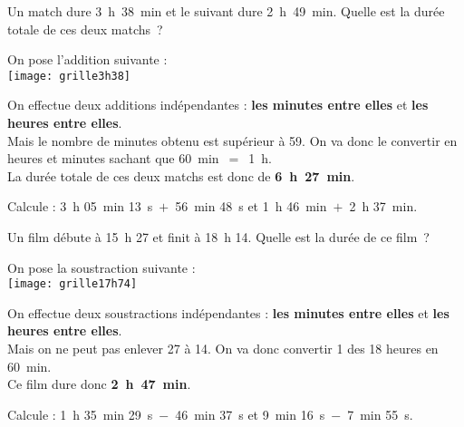 \begin{methode*1}

\begin{exemple*1}
Un match dure 3 h 38 min et le suivant dure 2 h 49 min. Quelle est la durée totale de ces deux matchs ? \\[1em]
\begin{minipage}[t]{.4\textwidth}
On pose l'addition suivante :\\[0.2em]

\texttt{[image: grille3h38]}
\end{minipage}\hfill%
\begin{minipage}[t]{.58\textwidth}
On effectue deux additions indépendantes : 
\textcolor{vert}{\textbf{les minutes entre elles}} et \textcolor{bleu}{\textbf{les heures entre elles}}.\\[0.75em]
Mais le nombre de minutes obtenu est supérieur à 59. 
On va donc le convertir en heures et minutes sachant que 60 min $=$ 1 h. \\[0.75em]
La durée totale de ces deux matchs est donc de \textcolor{rose}{\textbf{6 h 27 min}}.
\end{minipage}

\end{exemple*1}

\exercice

Calcule : 3 h 05 min 13 s $+$ 56 min 48 s et 1 h 46 min $+$ 2 h 37 min.

\end{methode*1}


\begin{methode*1}

\begin{exemple*1}
Un film débute à 15 h 27 et finit à 18 h 14. Quelle est la durée de ce film ? \\[1em]

\begin{minipage}[t]{.4\textwidth}
On pose la soustraction suivante :\\[0.2em]

\texttt{[image: grille17h74]}
\end{minipage}\hfill%
\begin{minipage}[t]{.58\textwidth}
On effectue deux soustractions indépendantes : 
\textcolor{vert}{\textbf{les minutes entre elles}} et \textcolor{bleu}{\textbf{les heures entre elles}}.\\[0.75em]
Mais on ne peut pas enlever 27 à 14. 
On va donc convertir 1 des 18 heures en 60 min. \\[0.75em]
Ce film dure donc \textcolor{rose}{\textbf{2 h 47 min}}.
\end{minipage}

\end{exemple*1}

\exercice

Calcule : 1 h 35 min 29 s $-$ 46 min 37 s et 9 min 16 s $-$ 7 min 55 s.


\end{methode*1}
